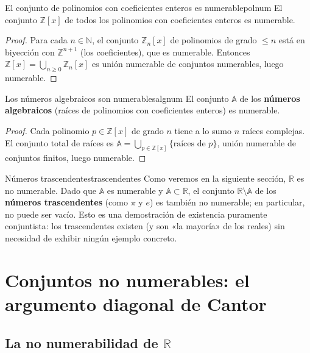 \begin{corolario}{El conjunto de polinomios con coeficientes enteros es numerable}{polnum}
El conjunto $\mathbb{Z}[x]$ de todos los polinomios con coeficientes enteros es numerable.
\end{corolario}

\begin{proof}
Para cada $n \in \mathbb{N}$, el conjunto $\mathbb{Z}_n[x]$ de polinomios de grado $\leq n$ está en biyección con $\mathbb{Z}^{n+1}$ (los coeficientes), que es numerable. Entonces $\mathbb{Z}[x] = \bigcup_{n \geq 0} \mathbb{Z}_n[x]$ es unión numerable de conjuntos numerables, luego numerable.
\end{proof}

\begin{corolario}{Los números algebraicos son numerables}{algnum}
El conjunto $\mathbb{A}$ de los \textbf{números algebraicos} (raíces de polinomios con coeficientes enteros) es numerable.
\end{corolario}

\begin{proof}
Cada polinomio $p \in \mathbb{Z}[x]$ de grado $n$ tiene a lo sumo $n$ raíces complejas. El conjunto total de raíces es $\mathbb{A} = \bigcup_{p \in \mathbb{Z}[x]} \{\text{raíces de } p\}$, unión numerable de conjuntos finitos, luego numerable.
\end{proof}

\begin{observacion}{Números trascendentes}{trascendentes}
Como veremos en la siguiente sección, $\mathbb{R}$ es no numerable. Dado que $\mathbb{A}$ es numerable y $\mathbb{A} \subset \mathbb{R}$, el conjunto $\mathbb{R} \setminus \mathbb{A}$ de los \textbf{números trascendentes} (como $\pi$ y $e$) es también no numerable; en particular, no puede ser vacío. Esto es una demostración de existencia puramente conjuntista: los trascendentes existen (y son «la mayoría» de los reales) sin necesidad de exhibir ningún ejemplo concreto.
\end{observacion}

\section{Conjuntos no numerables: el argumento diagonal de Cantor}

\subsection{La no numerabilidad de $\mathbb{R}$}

